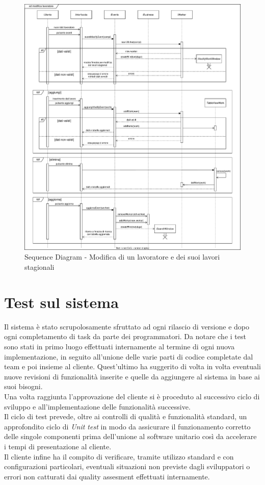 \documentclass[a4paper,11pt]{article}
\begin{document}
\begin{figure}[htpb]
	\centering
	\hspace*{-2cm}
	\includegraphics[width=1.3\textwidth]{diagrams/Sequence_Diagram_-_Modifca_lavoratore.pdf}
	\caption{Sequence Diagram - Modifica di un lavoratore e dei suoi lavori stagionali}
	\label{fig:sqc_dia_mod}
\end{figure}

\newpage

\section{Test sul sistema}
Il sistema è stato scrupolosamente sfruttato ad ogni rilascio di versione e
dopo ogni completamento di task da parte dei programmatori. Da notare che i test
sono stati in primo luogo effettuati internamente al termine di ogni nuova
implementazione, in seguito all'unione delle varie parti di codice completate
dal team e poi insieme al cliente. Quest'ultimo ha suggerito di volta in volta
eventuali nuove revisioni di funzionalità inserite e quelle da aggiungere al
sistema in base ai suoi bisogni.\\
Una volta raggiunta l'approvazione del cliente si è proceduto al
successivo ciclo di sviluppo e all'implementazione delle funzionalità
successive.\\
Il ciclo di test prevede, oltre ai controlli di qualità e funzionalità
standard, un approfondito ciclo di \emph{Unit test} in modo da assicurare il
funzionamento corretto delle singole componenti prima dell'unione al software
unitario così da accelerare i tempi di presentazione al cliente.\\
Il cliente infine ha il compito di verificare, tramite utilizzo standard e con
configurazioni particolari, eventuali situazioni non previste dagli sviluppatori
o errori non catturati dai quality assesment effettuati internamente.
\end{document}
